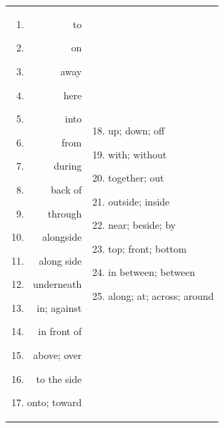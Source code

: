 \begin{table}
    \begin{tabular}{r|l}
      \begin{minipage}[b]{0.25\linewidth}%
      \begin{footnotesize}
        \begin{enumerate}[noitemsep,topsep=0pt,parsep=0pt,partopsep=0pt]
          \item  to
          \item  on
          \item  away
          \item  here
          \item  into
          \item  from
          \item  during
          \item  back of
          \item  through
          \item  alongside
          \item  along side
          \item  underneath
          \item  in; against
          \item  in front of
          \item \label{item:over} above; over
          \item  to the side
          \item  onto; toward
        \end{enumerate}
      \end{footnotesize}
      \end{minipage}& %
      \begin{minipage}[b]{0.65\linewidth}%
        \begin{footnotesize}
          \begin{enumerate}[noitemsep,topsep=0pt,parsep=0pt,partopsep=0pt]\setcounter{enumi}{17}
            \item  up; down; off
            \item  with; without
            \item  together; out
            \item  outside; inside
            \item  near; beside; by
            \item  top; front; bottom
            \item  in between; between
            \item  along; at; across; around

\end{enumerate}
\end{footnotesize}
\end{minipage}
\end{tabular}
\end{table}
